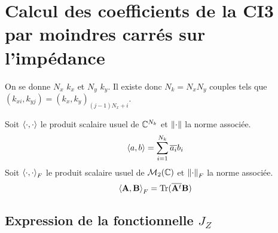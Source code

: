 \section{Calcul des coefficients de la CI3 par moindres carrés sur l'impédance}

    On se donne \(N_x\) \(k_x\) et \(N_y\) \(k_y\). Il existe donc \(N_k=N_xN_y\) couples tels que \((k_{xi},k_{yj}) = (k_x,k_y)_{(j-1)N_x+i}\).
    \begin{defn}
      Soit \(\left<{\cdot},{\cdot}\right>\) le produit scalaire usuel de \(\mathbb C^{N_{k}}\) et \(\left\lVert\cdot\right\rVert\) la norme associée.
      \begin{equation*}
        \left<{a},{b}\right> = \sum_{i=1}^{N_k} {\overline{a_i}} b_i
      \end{equation*}
      Soit \(\left<{\cdot},{\cdot}\right>_F\) le produit scalaire usuel de \(\mathcal{M}_2(\mathbb C)\) et \(\left\lVert\cdot\right\rVert_F\) la norme associée.
      \begin{equation*}
        \left<{\mathbf{A}},{\mathbf{B}}\right>_F = \operatorname{Tr}({\overline{\mathbf{A}^t}}\mathbf{B})
      \end{equation*}
    \end{defn}

  \subsection[Expression de la fonctionnelle JZ]{Expression de la fonctionnelle \(J_Z\)}

